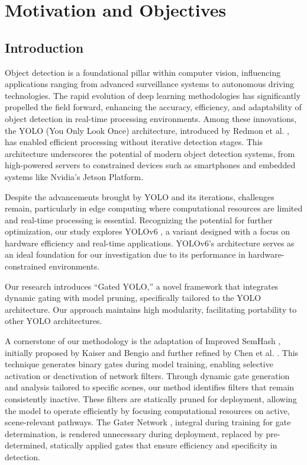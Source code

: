 \section{Motivation and Objectives}  

\subsection{Introduction}

Object detection is a foundational pillar within computer vision, influencing applications ranging from advanced surveillance systems to autonomous driving technologies. The rapid evolution of deep learning methodologies has significantly propelled the field forward, enhancing the accuracy, efficiency, and adaptability of object detection in real-time processing environments. Among these innovations, the YOLO (You Only Look Once) architecture, introduced by Redmon et al. \cite{redmon2016you}, has enabled efficient processing without iterative detection stages. This architecture underscores the potential of modern object detection systems, from high-powered servers to constrained devices such as smartphones and embedded systems like Nvidia's Jetson Platform.

Despite the advancements brought by YOLO and its iterations, challenges remain, particularly in edge computing where computational resources are limited and real-time processing is essential. Recognizing the potential for further optimization, our study explores YOLOv6 \cite{li2022yolov6,li2023yolov6}, a variant designed with a focus on hardware efficiency and real-time applications. YOLOv6's architecture \cite{li2022yolov6,li2023yolov6} serves as an ideal foundation for our investigation due to its performance in hardware-constrained environments.

Our research introduces ``Gated YOLO,'' a novel framework that integrates dynamic gating with model pruning, specifically tailored to the YOLO architecture. Our approach maintains high modularity, facilitating portability to other YOLO architectures.

A cornerstone of our methodology is the adaptation of Improved SemHash \cite{kaiser2018discrete}, initially proposed by Kaiser and Bengio and further refined by Chen et al. \cite{chen2019you}. This technique generates binary gates during model training, enabling selective activation or deactivation of network filters. Through dynamic gate generation and analysis tailored to specific scenes, our method identifies filters that remain consistently inactive. These filters are statically pruned for deployment, allowing the model to operate efficiently by focusing computational resources on active, scene-relevant pathways. The Gater Network \cite{chen2019you}, integral during training for gate determination, is rendered unnecessary during deployment, replaced by pre-determined, statically applied gates that ensure efficiency and specificity in detection.

